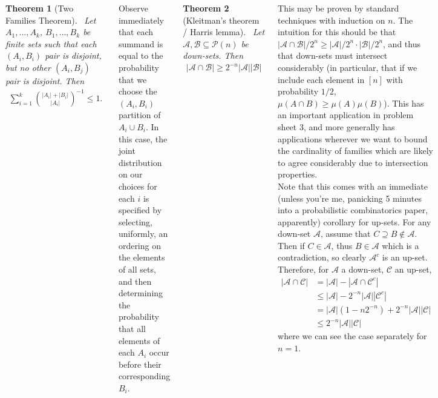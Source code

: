 \documentclass{tikzposter} %
\newcommand{\mc}{\mathcal}
\newtheorem{theorem}{Theorem}
\begin{document}
\begin{columns}
{    \begin{theorem}[Two Families Theorem]
    \ Let $A_1, \dots, A_k$, $B_1, \dots, B_k$ be finite sets such that each $(A_i, B_i)$ pair is disjoint, but no other $(A_i, B_j)$ pair is disjoint. Then
    \begin{align*}
      \sum_{i=1}^k {|A_i| + |B_i| \choose |A_i|}^{-1} \le 1.
    \end{align*}
    \end{theorem}
    \hphantom{}

    Observe immediately that each summand is equal to the probability that we choose the $(A_i, B_i)$ partition of $A_i \cup B_i$. In this case, the joint distribution on our choices for each $i$ is specified by selecting, uniformly, an ordering on the elements of all sets, and then determining the probability that all elements of each $A_i$ occur before their corresponding $B_i$. \\


      \begin{theorem}[Kleitman's theorem / Harris lemma]
      \ Let $\mc{A}, \mc{B} \subseteq \mc{P}(n)$ be down-sets. Then
      \begin{align*}
        |\mc{A} \cap \mc{B}| \ge 2^{-n}|\mc{A}||\mc{B}|
      \end{align*}
    \end{theorem}

    This may be proven by standard techniques with induction on $n$. The intuition for this should be that $|\mc{A} \cap \mc{B}| / 2^n \ge |\mc{A}|/2^n \cdot |\mc{B}| / 2^n$, and thus that down-sets must intersect considerably (in particular, that if we include each element in $[n]$ with probability $1/2$, $\mu(A \cap B) \ge \mu(A)\mu(B)$). This has an important application in problem sheet 3, and more generally has applications wherever we want to bound the cardinality of families which are likely to agree considerably due to intersection properties. \\

    Note that this comes with an immediate (unless you're me, panicking 5 minutes into a probabilistic combinatorics paper, apparently) corollary for up-sets. For any down-set $\mc{A}$, assume that $C \supseteq B \not\in \mc{A}$. Then if $C \in \mc{A}$, thus $B \in \mc{A}$ which is a contradiction, so clearly $\mc{A}^c$ is an up-set. Therefore, for $\mc{A}$ a down-set, $\mc{C}$ an up-set, 
    \begin{align*}
      |\mc{A} \cap \mc{C}| &= |\mc{A}| - |\mc{A} \cap \mc{C}^c| \\
                           &\le |\mc{A}| - 2^{-n}|\mc{A}| |\mc{C}^c| \\
      &= |\mc{A}|(1-n2^{-n}) + 2^{-n} |\mc{A}| |\mc{C}| \\
&\le 2^{-n}|\mc{A}| |\mc{C}|
    \end{align*}
    where we can see the case separately for $n = 1$. \\

}
\end{columns}
\end{document}
